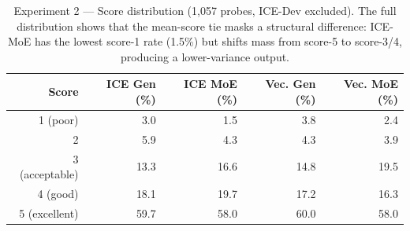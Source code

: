 \documentclass[10pt]{article}
\begin{document}
\begin{table}[htbp]
\centering
\small
\caption{Experiment 2 --- Per-conversation breakdown (generalist conditions). ICE wins more head-to-head comparisons on every conversation. On Dataset A (Creative Writing) ICE's win rate (37.2\%) is more than double the vector baseline's (18.0\%).}
\label{tab:exp2-perconv}
\end{table}

\begin{table}[htbp]
\centering
\small
\caption{Experiment 2 --- Score distribution (1,057 probes, ICE-Dev excluded). The full distribution shows that the mean-score tie masks a structural difference: ICE-MoE has the lowest score-1 rate (1.5\%) but shifts mass from score-5 to score-3/4, producing a lower-variance output.}
\label{tab:exp2-score-dist}
\begin{tabular}{rrrrr}
\toprule
\textbf{Score} & \textbf{ICE Gen (\%)} & \textbf{ICE MoE (\%)} & \textbf{Vec. Gen (\%)} & \textbf{Vec. MoE (\%)} \\
\midrule
1 (poor)      & 3.0 & 1.5 & 3.8 & 2.4 \\
2             & 5.9 & 4.3 & 4.3 & 3.9 \\
3 (acceptable)& 13.3 & 16.6 & 14.8 & 19.5 \\
4 (good)      & 18.1 & 19.7 & 17.2 & 16.3 \\
5 (excellent) & 59.7 & 58.0 & 60.0 & 58.0 \\
\bottomrule
\end{tabular}
\end{table}
\end{document}
